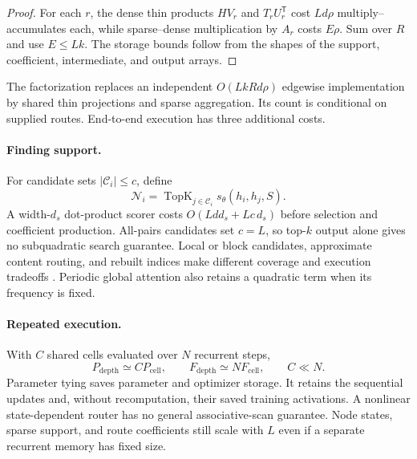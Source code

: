 \documentclass[10pt]{article}
\theoremstyle{definition}
\theoremstyle{remark}
\begin{document}
\begin{proof}
For each $r$, the dense thin products $HV_r$ and $T_rU_r^{\mathsf T}$ cost
$Ld\rho$ multiply--accumulates each, while sparse--dense multiplication by $A_r$ costs $E\rho$.
Sum over $R$ and use $E\leq Lk$.  The storage bounds follow from the shapes of the support,
coefficient, intermediate, and output arrays.
\end{proof}

The factorization replaces an independent $O(LkRd\rho)$ edgewise implementation by shared thin
projections and sparse aggregation.  Its count is conditional on supplied routes.  End-to-end
execution has three additional costs.

\paragraph{Finding support.}
For candidate sets $|\mathcal C_i|\leq c$, define
\begin{equation}
\mathcal N_i
=\operatorname{TopK}_{j\in\mathcal C_i}s_\theta(h_i,h_j,S).
\label{eq:candidate-support-selection}
\end{equation}
A width-$d_s$ dot-product scorer costs $O(Ldd_s+Lc\,d_s)$ before selection and coefficient
production.  All-pairs candidates set $c=L$, so top-$k$ output alone gives no subquadratic
search guarantee.  Local or block candidates, approximate content routing, and rebuilt indices
make different coverage and execution tradeoffs
\cite{beltagy2020longformer,zaheer2020bigbird,kitaev2020reformer,roy2021routing}.
Periodic global attention also retains a quadratic term when its frequency is fixed.

\paragraph{Repeated execution.}
With $C$ shared cells evaluated over $N$ recurrent steps,
\begin{equation}
P_{\mathrm{depth}}\simeq C P_{\mathrm{cell}},
\qquad
F_{\mathrm{depth}}\simeq N F_{\mathrm{cell}},
\qquad C\ll N.
\label{eq:shared-depth-parameter-compute-split}
\end{equation}
Parameter tying saves parameter and optimizer storage.  It retains the sequential updates and,
without recomputation, their saved training activations.  A nonlinear state-dependent router
has no general associative-scan guarantee.  Node states, sparse support, and route coefficients
still scale with $L$ even if a separate recurrent memory has fixed size.
\end{document}

